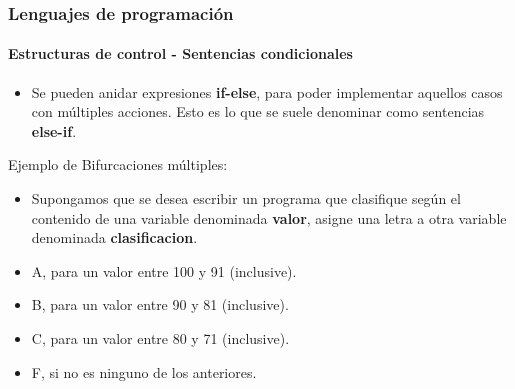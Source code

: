 \documentclass{beamer}
\begin{document}
		\begin{frame}
			\frametitle{Lenguajes de programaci\'on}
			\framesubtitle{Estructuras de control - Sentencias condicionales}

			\begin{itemize}
				\item Se pueden anidar expresiones \textbf{if-else}, para poder implementar aquellos casos con m\'ultiples acciones. Esto es lo que se suele denominar como sentencias \textbf{else-if}.
			\end{itemize}

			\begin{block}{Ejemplo de Bifurcaciones m\'ultiples:}
				\begin{itemize}
					\item Supongamos que se desea escribir un programa que clasifique seg\'un el contenido de una variable denominada \textbf{valor}, asigne una letra a otra variable denominada \textbf{clasificacion}.
					\item A, para un valor entre 100 y 91 (inclusive).
					\item B, para un valor entre 90 y 81 (inclusive).
					\item C, para un valor entre 80 y 71 (inclusive).
					\item F, si no es ninguno de los anteriores.
				\end{itemize}
			\end{block}
		\end{frame}
\end{document}

